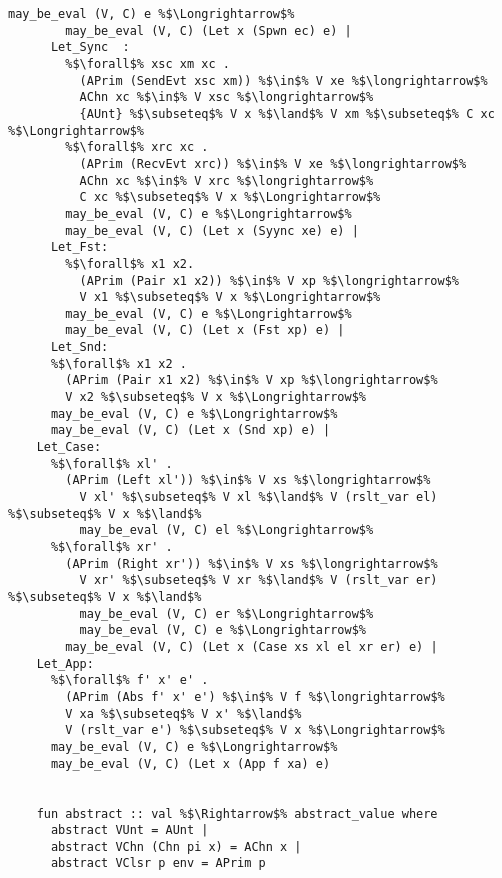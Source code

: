 \documentclass{article}
\begin{document}
\begin{lstlisting}[style=codestyle1, escapechar=\%]
        may_be_eval (V, C) e %$\Longrightarrow$%  
        may_be_eval (V, C) (Let x (Spwn ec) e) |
      Let_Sync  : 
        %$\forall$% xsc xm xc . 
          (APrim (SendEvt xsc xm)) %$\in$% V xe %$\longrightarrow$% 
          AChn xc %$\in$% V xsc %$\longrightarrow$%
          {AUnt} %$\subseteq$% V x %$\land$% V xm %$\subseteq$% C xc %$\Longrightarrow$%
        %$\forall$% xrc xc . 
          (APrim (RecvEvt xrc)) %$\in$% V xe %$\longrightarrow$%
          AChn xc %$\in$% V xrc %$\longrightarrow$%
          C xc %$\subseteq$% V x %$\Longrightarrow$%
        may_be_eval (V, C) e %$\Longrightarrow$%  
        may_be_eval (V, C) (Let x (Syync xe) e) |
      Let_Fst: 
        %$\forall$% x1 x2.
          (APrim (Pair x1 x2)) %$\in$% V xp %$\longrightarrow$%
          V x1 %$\subseteq$% V x %$\Longrightarrow$% 
        may_be_eval (V, C) e %$\Longrightarrow$% 
        may_be_eval (V, C) (Let x (Fst xp) e) |
      Let_Snd: 
      %$\forall$% x1 x2 .
        (APrim (Pair x1 x2) %$\in$% V xp %$\longrightarrow$%
        V x2 %$\subseteq$% V x %$\Longrightarrow$% 
      may_be_eval (V, C) e %$\Longrightarrow$% 
      may_be_eval (V, C) (Let x (Snd xp) e) |
    Let_Case:
      %$\forall$% xl' .
        (APrim (Left xl')) %$\in$% V xs %$\longrightarrow$%
          V xl' %$\subseteq$% V xl %$\land$% V (rslt_var el) %$\subseteq$% V x %$\land$%
          may_be_eval (V, C) el %$\Longrightarrow$%
      %$\forall$% xr' .
        (APrim (Right xr')) %$\in$% V xs %$\longrightarrow$%
          V xr' %$\subseteq$% V xr %$\land$% V (rslt_var er) %$\subseteq$% V x %$\land$%
          may_be_eval (V, C) er %$\Longrightarrow$%
          may_be_eval (V, C) e %$\Longrightarrow$% 
        may_be_eval (V, C) (Let x (Case xs xl el xr er) e) |
    Let_App:
      %$\forall$% f' x' e' .
        (APrim (Abs f' x' e') %$\in$% V f %$\longrightarrow$%
        V xa %$\subseteq$% V x' %$\land$%
        V (rslt_var e') %$\subseteq$% V x %$\Longrightarrow$% 
      may_be_eval (V, C) e %$\Longrightarrow$% 
      may_be_eval (V, C) (Let x (App f xa) e)


    fun abstract :: val %$\Rightarrow$% abstract_value where
      abstract VUnt = AUnt |
      abstract VChn (Chn pi x) = AChn x |
      abstract VClsr p env = APrim p




\end{lstlisting}
\end{document}
